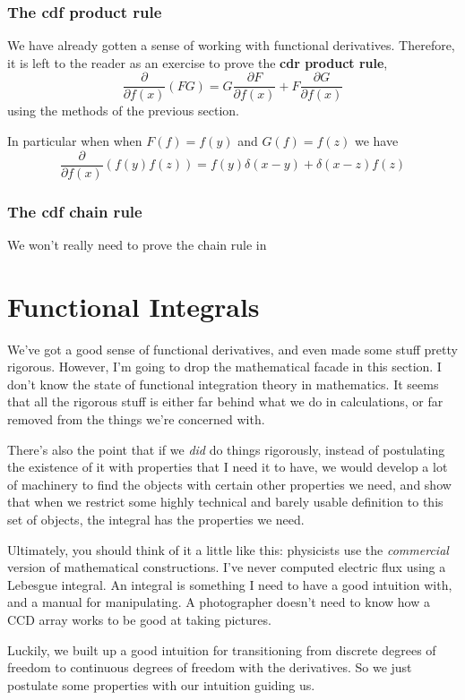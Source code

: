 \documentclass[main.tex]{subfiles}
\begin{document}
\subsubsection{The cdf product rule}
We have already gotten a sense of working with functional derivatives. Therefore, it is left to the reader as an exercise to prove the \textbf{cdr product rule},
\begin{equation} \label{cdfprod}
\boxed{\frac{\partial}{\partial f(x)} \left( FG \right) = G \frac{\partial F}{\partial f(x)} + F \frac{\partial G}{\partial f(x)}} 
\end{equation}
using the methods of the previous section. 

In particular when when $F(f) = f(y)$ and $G(f) = f(z)$ we have
\[
\frac{\partial}{\partial f(x)} \left( f(y) f(z) \right) = f(y) \delta(x - y) + \delta(x - z) f(z)
\]
\subsubsection{The cdf chain rule}
We won't really need to prove the chain rule in 
\section{Functional Integrals}
We've got a good sense of functional derivatives, and even made some stuff pretty rigorous. However, I'm going to drop the mathematical facade in this section. I don't know the state of functional integration theory in mathematics. It seems that all the rigorous stuff is either far behind what we do in calculations, or far removed from the things we're concerned with.

There's also the point that if we \textit{did} do things rigorously, instead of postulating the existence of it with properties that I need it to have, we would develop a lot of machinery to find the objects with certain other properties we need, and show that when we restrict some highly technical and barely usable definition to this set of objects, the integral has the properties we need. 

Ultimately, you should think of it a little like this: physicists use the \textit{commercial} version of mathematical constructions. I've never computed electric flux using a Lebesgue integral. An integral is something I need to have a good intuition with, and a manual for manipulating. A photographer doesn't need to know how a CCD array works to be good at taking pictures. 

Luckily, we built up a good intuition for transitioning from discrete degrees of freedom to continuous degrees of freedom with the derivatives. So we just postulate some properties with our intuition guiding us.
\end{document}
